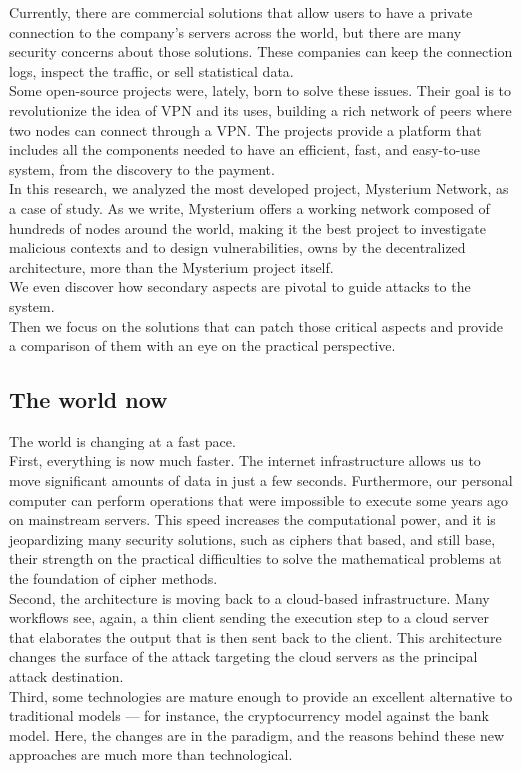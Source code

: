 \documentclass[12pt]{article}
\begin{document}
	Currently, there are commercial solutions that allow users to have a private connection to the company's servers across the world, but there are many security concerns about those solutions. These companies can keep the connection logs, inspect the traffic, or sell statistical data.\\
    Some open-source projects were, lately, born to solve these issues. Their goal is to revolutionize the idea of VPN and its uses, building a rich network of peers where two nodes can connect through a VPN. The projects provide a platform that includes all the components needed to have an efficient, fast, and easy-to-use system, from the discovery to the payment.\\
    
    In this research, we analyzed the most developed project, Mysterium Network, as a case of study. As we write, Mysterium offers a working network composed of hundreds of nodes around the world, making it the best project to investigate malicious contexts and to design vulnerabilities, owns by the decentralized architecture, more than the Mysterium project itself.\\
	We even discover how secondary aspects are pivotal to guide attacks to the system.\\
    Then we focus on the solutions that can patch those critical aspects and provide a comparison of them with an eye on the practical perspective.
	
	\subsection{The world now}
	The world is changing at a fast pace.\\
	First, everything is now much faster. The internet infrastructure allows us to move significant amounts of data in just a few seconds. Furthermore, our personal computer can perform operations that were impossible to execute some years ago on mainstream servers. This speed increases the computational power, and it is jeopardizing many security solutions, such as ciphers that based, and still base, their strength on the practical difficulties to solve the mathematical problems at the foundation of cipher methods.\\
	Second, the architecture is moving back to a cloud-based infrastructure. Many workflows see, again, a thin client sending the execution step to a cloud server that elaborates the output that is then sent back to the client. This architecture changes the surface of the attack targeting the cloud servers as the principal attack destination.\\
	Third, some technologies are mature enough to provide an excellent alternative to traditional models — for instance, the cryptocurrency model against the bank model. Here, the changes are in the paradigm, and the reasons behind these new approaches are much more than technological.\\
\end{document}
